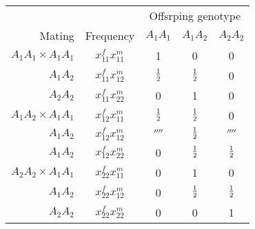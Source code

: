 \begin{center}
\begin{tabular}{rcccc}
                       &           & \multicolumn{3}{c}{Offsrping genotype} \\
Mating                 & Frequency     & $A_1A_1$ & $A_1A_2$ & $A_2A_2$ \\
\hline
$A_1A_1 \times A_1A_1$ & $x_{11}^fx_{11}^m$     &        1 &        0 &        0 \\
              $A_1A_2$ & $x_{11}^fx_{12}^m$ &    $\frac{1}{2}$ &    $\frac{1}{2}$ &        0 \\
              $A_2A_2$ & $x_{11}^fx_{22}^m$ &        0 &        1 &        0 \\
$A_1A_2 \times A_1A_1$ & $x_{12}^fx_{11}^m$ &    $\frac{1}{2}$ &    $\frac{1}{2}$ &        0 \\
              $A_1A_2$ & $x_{12}^fx_{12}^m$     &  $\fourth$ &    $\frac{1}{2}$ &  $\fourth$ \\
              $A_1A_2$ & $x_{12}^fx_{22}^m$ &        0 &    $\frac{1}{2}$ &    $\frac{1}{2}$ \\
$A_2A_2 \times A_1A_1$ & $x_{22}^fx_{11}^m$ &        0 &        1 &        0 \\
              $A_1A_2$ & $x_{22}^fx_{12}^m$ &        0 &    $\frac{1}{2}$ &    $\frac{1}{2}$ \\
              $A_2A_2$ & $x_{22}^fx_{22}^m$     &        0 &
0 & 1 \\
\end{tabular}
\end{center}


